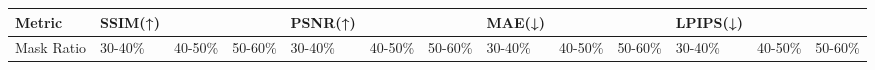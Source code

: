 \begin{tabular}{lllllllllllll}
\toprule
Metric & SSIM(↑) &  &  & PSNR(↑) &  &  & MAE(↓) &  &  & LPIPS(↓) &  &  \\
\midrule
Mask Ratio & 30-40\% & 40-50\% & 50-60\% & 30-40\% & 40-50\% & 50-60\% & 30-40\% & 40-50\% & 50-60\% & 30-40\% & 40-50\% & 50-60\% \\
\bottomrule
\end{tabular}
